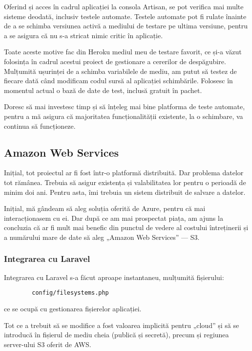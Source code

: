 		Oferind și acces în cadrul aplicației la consola Artisan, se pot verifica mai multe sisteme deodată, inclusiv testele automate.
		Testele automate pot fi rulate înainte de a se schimba versiunea activă a mediului de testare pe ultima versiune, pentru a se asigura că nu s-a stricat nimic critic în aplicație.

		Toate aceste motive fac din Heroku mediul meu de testare favorit, ce și-a văzut folosința în cadrul acestui proiect de gestionare a cererilor de despăgubire.
		Mulțumită ușurinței de a schimba variabilele de mediu, am putut să testez de fiecare dată când modificam codul sursă al aplicației schimbările.
		Folosesc în momentul actual o bază de date de test, inclusă gratuit în pachet.

		Doresc să mai investesc timp și să înțeleg mai bine platforma de teste automate, pentru a mă asigura că majoritatea funcționalității existente, la o schimbare, va continua să funcționeze.

	\subsection{Amazon Web Services}

		Inițial, tot proiectul ar fi fost într-o platformă distribuită.
		Dar problema datelor tot rămânea.
		Trebuia să asigur existența și valabilitatea lor pentru o perioadă de minim doi ani.
		Pentru asta, îmi trebuia un sistem distribuit de salvare a datelor.

		Inițial, mă gândeam să aleg soluția oferită de Azure, pentru că mai interacționasem cu ei.
		Dar după ce am mai prospectat piața, am ajuns la concluzia că ar fi mult mai benefic din punctul de vedere al costului întreținerii și a numărului mare de date să aleg „Amazon Web Services” --- S3.

		\subsubsection{Integrarea cu Laravel}

		Integrarea cu Laravel s-a făcut aproape instantaneu, mulțumită fișierului:
		\begin{verbatim}
		config/filesystems.php
		\end{verbatim}
		ce se ocupă cu gestionarea fișierelor aplicației.

		Tot ce a trebuit să se modifice a fost valoarea implicită pentru „cloud” și să se introducă în fișierul de mediu cheia (publică și secretă), precum și regiunea server-ului S3 oferit de AWS.

